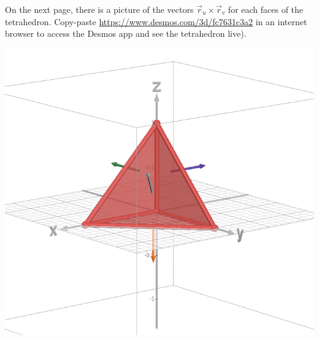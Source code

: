 \documentclass[12pt]{article}
\newcommand{\spc}{\vspace*{0.5cm}}
\begin{document}
	On the next page, there is a picture of the vectors $\vec{r}_u \times \vec{r}_v$ for each faces of the tetrahedron. Copy-paste \url{https://www.desmos.com/3d/fc7631c3a2} in an internet browser to access the Desmos app and see the tetrahedron live).
		\begin{center}
		\includegraphics[scale=0.4]{NormalsTetrahedron.png}
		\end{center}



	\spc 
\end{document}
